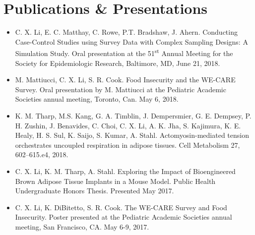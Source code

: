 
\section{Publications \& Presentations}
\begin{itemize}[leftmargin = 0cm]
\item [] { C. X. Li}, E. C. Matthay, C. Rowe, P.T. Bradshaw, J. Ahern. Conducting Case-Control Studies using Survey Data with Complex Sampling Designs: A Simulation Study. Oral presentation at the 51\textsuperscript{st} Annual Meeting for the Society for Epidemiologic Research, Baltimore, MD, June 21, 2018.
\item []M. Mattiucci, { C. X. Li}, S. R. Cook. Food Insecurity and the WE-CARE Survey. Oral presentation by M. Mattiucci at the Pediatric Academic Societies annual meeting, Toronto, Can. May 6, 2018.
\item [] K. M. Tharp, M.S. Kang, G. A. Timblin, J. Dempersmier, G. E. Dempsey, P. H. Zushin, J. Benavides, C. Choi, { C. X. Li}, A. K. Jha, S. Kajimura, K. E. Healy, H. S. Sul, K. Saijo, S. Kumar, A. Stahl. Actomyosin-mediated tension orchestrates uncoupled respiration in adipose tissues. { Cell Metabolism} 27, 602–615.e4, 2018.
\item []{ C. X. Li}, K. M. Tharp, A. Stahl. Exploring the Impact of Bioengineered Brown Adipose Tissue Implants in a Mouse Model. Public Health Undergraduate Honors Thesis.  Presented May 2017.
\item []{ C. X. Li}, K. DiBitetto, S. R. Cook. The WE-CARE Survey and Food Insecurity. Poster presented at the Pediatric Academic Societies annual meeting, San Francisco, CA. May 6-9, 2017.

\end{itemize}


\sectionsep 